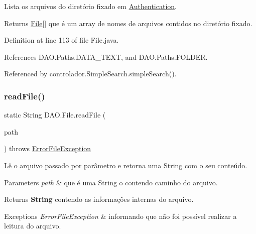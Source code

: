 Lista os arquivos do diretório fixado em \hyperlink{enumDAO_1_1Authentication}{Authentication}.

\begin{DoxyReturn}{Returns}
\hyperlink{classDAO_1_1File}{File}\mbox{[}\mbox{]} que é um array de nomes de arquivos contidos no diretório fixado. 
\end{DoxyReturn}


Definition at line 113 of file File.\+java.



References D\+A\+O.\+Paths.\+D\+A\+T\+A\+\_\+\+T\+E\+XT, and D\+A\+O.\+Paths.\+F\+O\+L\+D\+ER.



Referenced by controlador.\+Simple\+Search.\+simple\+Search().

\hypertarget{classDAO_1_1File_a348c16a4685741546b894803f95fc8b7}{}\label{classDAO_1_1File_a348c16a4685741546b894803f95fc8b7} 
\subsubsection{\texorpdfstring{read\+File()}{readFile()}}
{\footnotesize\ttfamily static String D\+A\+O.\+File.\+read\+File (\begin{DoxyParamCaption}\item[{String}]{path }\end{DoxyParamCaption}) throws \hyperlink{classexcessao_1_1ErrorFileException}{Error\+File\+Exception}\hspace{0.3cm}{\ttfamily [static]}}

Lê o arquivo passado por parâmetro e retorna uma String com o seu conteúdo.


\begin{DoxyParams}{Parameters}
{\em path} & que é uma String o contendo caminho do arquivo. \\
\hline
\end{DoxyParams}
\begin{DoxyReturn}{Returns}
{\bfseries String} contendo as informações internas do arquivo. 
\end{DoxyReturn}

\begin{DoxyExceptions}{Exceptions}
{\em Error\+File\+Exception} & informando que não foi possível realizar a leitura do arquivo. \\
\hline
\end{DoxyExceptions}


